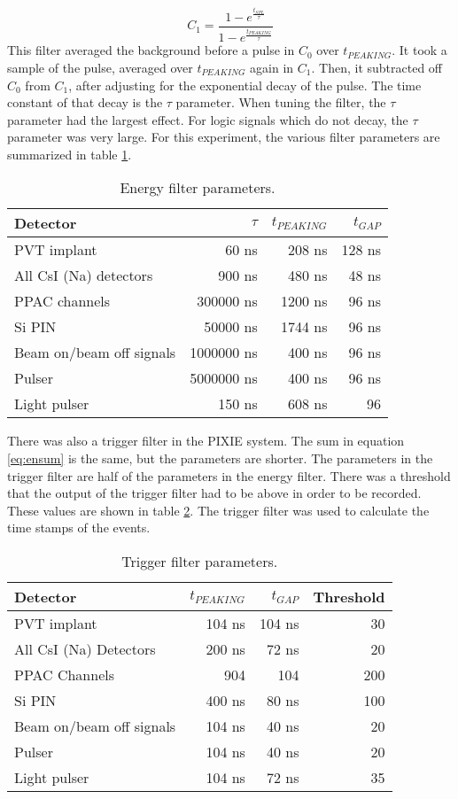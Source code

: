\documentclass[../MaxHughesThesis.tex]{subfiles}
\begin{document}
\begin{equation}
	C_{1} = \frac{1 - e^{\frac{t_{SPL}}{\tau}}}{1 - e^{\frac{t_{PEAKING}}{\tau}}}
	\label{eq:c1sum}
\end{equation}
%
This filter averaged the background before a pulse in $C_{0}$ over $t_{PEAKING}$.
It took a sample of the pulse, averaged over $t_{PEAKING}$ again in $C_{1}$.
Then, it subtracted off $C_{0}$ from $C_{1}$, after adjusting for the exponential decay of the pulse.
The time constant of that decay is the $\tau$ parameter.
When tuning the filter, the $\tau$ parameter had the largest effect.
For logic signals which do not decay, the $\tau$ parameter was very large.
For this experiment, the various filter parameters are summarized in table \ref{tab:pixieparams}.  
%
\begin{table}[!hbt]
	\centering
	\caption{Energy filter parameters.}
		\begin{tabular}{lrrr}
			Detector & $\tau$ & $t_{PEAKING}$ & $t_{GAP}$ \\ \hline
			PVT implant & 60 ns & 208 ns & 128 ns \\
			All CsI (Na) detectors & 900 ns & 480 ns & 48 ns \\
			PPAC channels & 300000 ns & 1200 ns & 96 ns \\ 
			Si PIN & 50000 ns & 1744 ns & 96 ns \\
			Beam on/beam off signals & 1000000 ns & 400 ns & 96 ns \\
			Pulser & 5000000 ns & 400 ns & 96 ns \\
			Light pulser & 150 ns & 608 ns & 96 
		\end{tabular}	
		\label{tab:pixieparams}
\end{table}
%
There was also a trigger filter in the PIXIE system.
The sum in equation \ref{eq:ensum} is the same, but the parameters are shorter.
The parameters in the trigger filter are half of the parameters in the energy filter.
There was a threshold that the output of the trigger filter had to be above in order to be recorded.
These values are shown in table \ref{tab:trigfilter}.
The trigger filter was used to calculate the time stamps of the events.  
%
\begin{table}[!hbt]
	\centering
	\caption{Trigger filter parameters.}
		\begin{tabular}{lrrr}
			Detector & $t_{PEAKING}$ & $t_{GAP}$ & Threshold\\ \hline
			PVT implant & 104 ns & 104 ns & 30 \\ 
			All CsI (Na) Detectors & 200 ns & 72 ns & 20 \\
			PPAC Channels & 904 & 104 & 200 \\ 
			Si PIN & 400 ns & 80 ns & 100 \\
			Beam on/beam off signals & 104 ns & 40 ns & 20 \\
			Pulser & 104 ns & 40 ns & 20 \\
			Light pulser & 104 ns & 72 ns & 35
		\end{tabular}	
		\label{tab:trigfilter}
\end{table}
%
\end{document}
